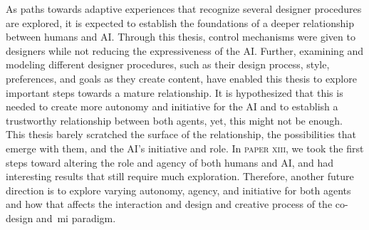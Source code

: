 As paths towards adaptive experiences that recognize several designer procedures are explored, it is expected to establish the foundations of a deeper relationship between humans and AI. Through this thesis, control mechanisms were given to designers while not reducing the expressiveness of the AI. Further, examining and modeling different designer procedures, such as their design process, style, preferences, and goals as they create content, have enabled this thesis to explore important steps towards a mature relationship. It is hypothesized that this is needed to create more autonomy and initiative for the AI and to establish a trustworthy relationship between both agents, yet, this might not be enough. This thesis barely scratched the surface of the relationship, the possibilities that emerge with them, and the AI's initiative and role. In \textsc{paper xiii}, we took the first steps toward altering the role and agency of both humans and AI, and had interesting results that still require much exploration. Therefore, another future direction is to explore varying autonomy, agency, and initiative for both agents and how that affects the interaction and design and creative process of the co-design and~\acrshort{mi} paradigm.









